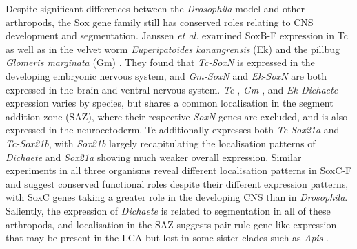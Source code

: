 \documentclass[withindex,glossary]{cam-thesis}
\begin{document}
Despite significant differences between the \emph{Drosophila} model and
other arthropods, the Sox gene family still has conserved roles relating
to CNS development and segmentation. Janssen \emph{et al.} examined
SoxB-F expression in Tc as well as in the velvet worm
\emph{Euperipatoides kanangrensis} (\gls{Ek}) and the pillbug \emph{Glomeris
marginata} (\gls{Gm}) . They found that \emph{Tc-SoxN}
is expressed in the developing embryonic nervous system, and
\emph{Gm-SoxN} and \emph{Ek-SoxN} are both expressed in the brain and
ventral nervous system. \emph{Tc-}, \emph{Gm-}, and \emph{Ek-Dichaete}
expression varies by species, but shares a common localisation in the
segment addition zone (\gls{SAZ}), where their respective \emph{SoxN} genes
are excluded, and is also expressed in the neuroectoderm. Tc
additionally expresses both \emph{Tc-Sox21a} and \emph{Tc-Sox21b}, with
\emph{Sox21b} largely recapitulating the localisation patterns of
\emph{Dichaete} and \emph{Sox21a} showing much weaker overall
expression. Similar experiments in all three organisms reveal different
localisation patterns in SoxC-F and suggest conserved functional roles
despite their different expression patterns, with SoxC genes taking a
greater role in the developing CNS than in \emph{Drosophila}. Saliently,
the expression of \emph{Dichaete} is related to segmentation in all of
these arthropods, and localisation in the SAZ suggests pair rule
gene-like expression that may be present in the LCA but lost in some
sister clades such as \emph{Apis} .
\end{document}
